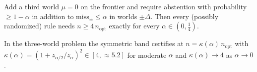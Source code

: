 \begin{proposition}
\label{prop:t1b-3world}
Add a third world $\mu=0$ on the frontier and require abstention with probability
$\ge1-\alpha$ in addition to $\mathrm{miss}_\pm\le\alpha$ in worlds $\pm\Delta$. Then every
(possibly randomized) rule needs $n\ge 4\,n_{\mathrm{opt}}$ exactly for every
$\alpha\in(0,\tfrac14)$.
\end{proposition}

\begin{proposition}
\label{prop:t1b-achieve}
In the three-world problem the symmetric band certifies at
$n=\kappa(\alpha)\,n_{\mathrm{opt}}$ with
$\kappa(\alpha)=(1+z_{\alpha/2}/z_\alpha)^2\in[4,\approx5.2]$ for moderate $\alpha$ and
$\kappa(\alpha)\to4$ as $\alpha\to0$.
\end{proposition}
